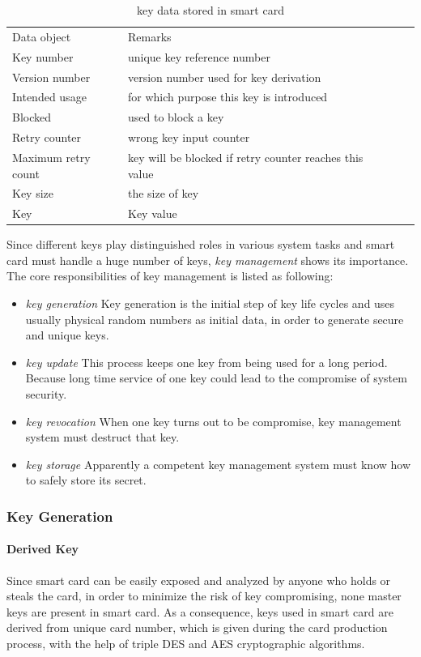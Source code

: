 \begin{table}[!htbp]
\caption{key data stored in smart card\cite{handbook}}
\begin{tabular}{lllll}
\hline\hline
Data object & Remarks\\[0.5ex]
Key number & unique key reference number\\
Version number & version number used for key derivation\\
Intended usage & for which purpose this key is introduced\\
Blocked & used to block a key\\
Retry counter & wrong key input counter\\
Maximum retry count & key will be blocked if retry counter reaches this value\\
Key size & the size of key\\
Key & Key value\\
\hline
\end{tabular}
\label{table:smart-card-key}
\end{table}

Since different keys play distinguished roles in various system tasks and smart card must handle a huge number of keys, \emph{key management} shows its importance. The core responsibilities of key management is listed as following\cite{handbook}:
\begin{itemize}
\item \emph{key generation} Key generation is the initial step of key life cycles and uses usually physical random numbers as initial data, in order to generate secure and unique keys. 
\item \emph{key update} This process keeps one key from being used for a long period. Because long time service of one key could lead to the compromise of system security.
\item \emph{key revocation} When one key turns out to be compromise, key management system must destruct that key.
\item \emph{key storage} Apparently a competent key management system must know how to safely store its secret.
\end{itemize}
\subsubsection{Key Generation}
\paragraph{Derived Key}
Since smart card can be easily exposed and analyzed by anyone who holds or steals the card, in order to minimize the risk of key compromising, none master keys are present in smart card. As a consequence, keys used in smart card are derived from unique card number, which is given during the card production process, with the help of triple DES and AES cryptographic algorithms\cite{handbook}.
